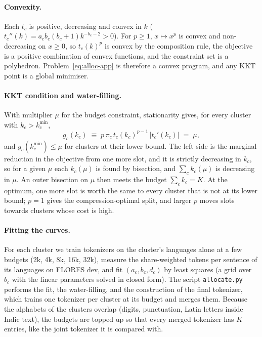 \paragraph{Convexity.}
Each $t_c$ is positive, decreasing and convex in $k$ ($t_c''(k)=a_c b_c(b_c+1)k^{-b_c-2}>0$).
For $p\ge1$, $x\mapsto x^{p}$ is convex and non-decreasing on $x\ge0$, so
$t_c(k)^{p}$ is convex by the composition rule, the objective is a positive combination of
convex functions, and the constraint set is a polyhedron. Problem~\eqref{eq:alloc-app} is
therefore a convex program, and any KKT point is a global minimiser.

\paragraph{KKT condition and water-filling.}
With multiplier $\mu$ for the budget constraint, stationarity gives, for every cluster with
$k_c>k^{\min}_c$,
\begin{equation}
  g_c(k_c) \;\equiv\; p\,\pi_c\, t_c(k_c)^{p-1}\,\bigl|t_c'(k_c)\bigr| \;=\; \mu,
\end{equation}
and $g_c(k^{\min}_c)\le\mu$ for clusters at their lower bound. The left side is the marginal
reduction in the objective from one more slot, and it is strictly decreasing in $k_c$, so
for a given $\mu$ each $k_c(\mu)$ is found by bisection, and $\sum_c k_c(\mu)$ is decreasing
in $\mu$. An outer bisection on $\mu$ then meets the budget $\sum_c k_c=K$. At the optimum,
one more slot is worth the same to every cluster that is not at its lower bound; $p=1$
gives the compression-optimal split, and larger $p$ moves slots towards clusters whose cost
is high.

\paragraph{Fitting the curves.}
For each cluster we train tokenizers on the cluster's languages alone at a few budgets
(2k, 4k, 8k, 16k, 32k), measure the share-weighted tokens per sentence of its languages on
FLORES dev, and fit $(a_c,b_c,d_c)$ by least squares (a grid over $b_c$ with the linear
parameters solved in closed form). The script \texttt{allocate.py} performs the fit, the
water-filling, and the construction of the final tokenizer, which trains one tokenizer per
cluster at its budget and merges them. Because the alphabets of the clusters overlap
(digits, punctuation, Latin letters inside Indic text), the budgets are topped up so that
every merged tokenizer has $K$ entries, like the joint tokenizer it is compared with.


